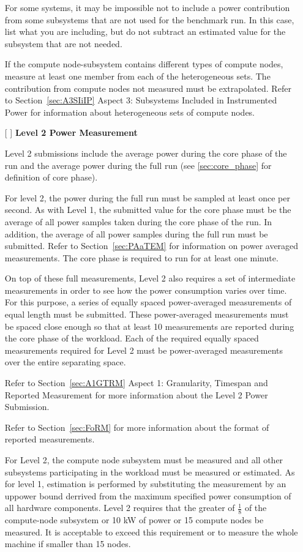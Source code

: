 \begin{itemize}
For some systems, it may be impossible not to include a power contribution from some subsystems that are not used for the benchmark run.
In this case, list what you are including, but do not subtract an estimated value for the subsystem that are not needed.

If the compute node-subsystem contains different types of compute nodes, measure at least one member from each of the heterogeneous sets. The contribution from compute nodes not measured must be extrapolated. Refer to 
Section~\ref{sec:A3SIiIP} Aspect 3: Subsystems Included in Instrumented Power for information about heterogeneous sets of compute nodes.

\newpage
\item[{[ ]}]
\textbf{Level 2 Power Measurement}

Level 2 submissions include the average power during the core phase of the run and the average power during the full run (see \ref{sec:core_phase} for definition of core phase).

For level 2, the power during the full run must be sampled at least once per second.
As with Level 1, the submitted value for the core phase must be the average of all power samples taken during the core phase of the run.
In addition, the average of all power samples during the full run must be submitted.
Refer to Section~\ref{sec:PAaTEM} for information on power averaged measurements.
The core phase is required to run for at least one minute.

On top of these full measurements, Level 2 also requires a set of intermediate measurements in order to see how the power consumption varies over time.
For this purpose, a series of equally spaced power-averaged measurements of equal length must be submitted.
These power-averaged measurements must be spaced close enough so that at least 10 measurements are reported during the core phase of the workload.
Each of the required equally spaced measurements required for Level 2 must be power-averaged measurements over the entire separating space. 

Refer to Section~\ref{sec:A1GTRM} Aspect 1: Granularity, Timespan and Reported Measurement for more information about the Level 2 Power Submission. 

Refer to Section~\ref{sec:FoRM} for more information about the format of reported measurements.

For Level 2, the compute node subsystem must be measured and all other subsystems participating in the workload must be measured or estimated.
As for level 1, estimation is performed by substituting the measurement by an uppower bound derrived from the maximum specified power consumption of all hardware components.
Level 2 requires that the greater of $ \frac{1}{8} $ of the compute-node subsystem or 10 kW of power or 15 compute nodes be measured.
It is acceptable to exceed this requirement or to measure the whole machine if smaller than 15 nodes.


\end{itemize}
